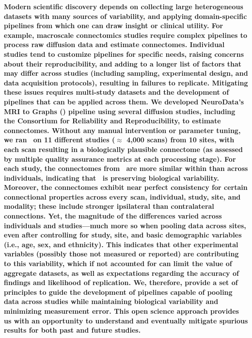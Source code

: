 \documentclass[11pt]{article}
\begin{document}
\noindent
\textbf{Modern scientific discovery depends on collecting large heterogeneous datasets with many sources of variability, and applying domain-specific pipelines from which one can draw insight or clinical utility.
For example, macroscale connectomics studies require complex pipelines to process raw diffusion data and estimate connectomes.
Individual studies tend to customize pipelines for specific needs, raising concerns about their reproducibility,  and adding to a longer list of factors that may differ across studies (including sampling, experimental design, and data acquisition protocols), resulting in failures to replicate.
Mitigating these issues requires multi-study datasets and the development of pipelines that can be applied across them.
We developed NeuroData's MRI to Graphs (\ndmg) pipeline using several diffusion studies, including the Consortium for Reliability and Reproducibility, to estimate connectomes.
Without any manual intervention or parameter tuning, we ran \ndmg~on 11 different studies ($\approx$ 4,000 scans) from 10 sites,  with each scan resulting in a biologically plausible connectome (as assessed by multiple quality assurance metrics at each processing stage).
For each study, the connectomes from \ndmg~are more similar within than across individuals, indicating that \ndmg~is preserving biological variability.
Moreover, the connectomes exhibit near perfect consistency for certain connectional properties across every scan, individual, study, site, and modality; these include stronger ipsilateral than contralateral connections.
Yet, the magnitude of the differences varied across individuals and studies---much more so when pooling data across sites, even after controlling for study, site, and basic demographic variables (i.e., age, sex, and ethnicity).
This indicates that other experimental variables (possibly those not measured or reported) are contributing to this variability, which if not accounted for can limit the value of aggregate datasets, as well as expectations regarding the accuracy of findings and likelihood of replication.
We, therefore, provide a set of principles to guide the development of pipelines capable of pooling data across studies while maintaining biological variability and minimizing measurement error.
This open science approach provides us with an opportunity to understand and eventually mitigate spurious results for both past and future studies.
}
\end{document}

